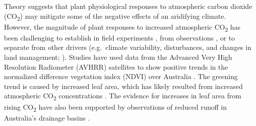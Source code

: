 \documentclass[gc, manuscript]{copernicus}
\begin{document}
Theory suggests that plant physiological responses to atmospheric carbon
dioxide (CO\textsubscript{2}) may mitigate some of the negative effects
of an aridifying climate. However, the magnitude of plant responses to
increased atmospheric CO\textsubscript{2} has been challenging to
establish in field experiments \citep{jiangFateCarbonMature2020b}, from
observations \citep[\citet{frankenberg_etal21a},
\citet{zhu_etal21}]{walkerIntegratingEvidenceTerrestrial2020b}, or to
separate from other drivers (e.g.~climate variability, disturbances, and
changes in land management; \citet{zhuGreeningEarthIts2016a}). Studies
have used data from the Advanced Very High Resolution Radiometer (AVHRR)
satellites to show positive trends in the normalized difference
vegetation index (NDVI) over Australia
\citep{donohueClimaterelatedTrendsAustralian2009c}. The greening trend
is caused by increased leaf area, which has likely resulted from
increased atmospheric CO\textsubscript{2} concentrations
\citep{donohueClimaterelatedTrendsAustralian2009c, ukkolaReducedStreamflowWaterstressed2016b}.
The evidence for increases in leaf area from rising CO\textsubscript{2}
have also been supported by observations of reduced runoff in
Australia's drainage basins
\citep{trancosoCOVegetationFeedbacks2017b, ukkolaReducedStreamflowWaterstressed2016b}.
\end{document}
